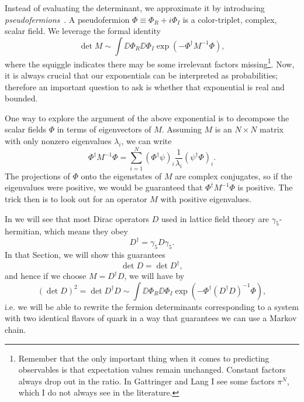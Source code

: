 Instead of evaluating the determinant, we approximate it
by introducing 
{\it pseudofermions}~\cite{fucito_proposal_1981,weingarten_physics_1981}.
A pseudofermion $\Phi\equiv\Phi_R+i\Phi_I$ is a color-triplet, complex, 
scalar field. We leverage the formal identity
\begin{equation}\label{eq:pseudofermionIdentity}
\det M \sim \int\DD{\Phi_R}\DD{\Phi_I}\exp\left(-\Phi^\dagger M^{-1}\Phi\right),
\end{equation}
where the squiggle indicates there may be some irrelevant factors 
missing\footnote{Remember that the only important thing when it comes to
predicting observables is that expectation values remain unchanged.
Constant factors always drop out in the ratio. In Gattringer and Lang I
see some factors $\pi^N$, which I do not always see in the literature.}.
Now, it is always crucial that our exponentials can be interpreted
as probabilities; therefore an important question to ask is whether
that exponential is real and bounded.

One way to explore the argument of the above exponential is to decompose
the scalar fields $\Phi$ in terms of eigenvectors of $M$. Assuming $M$
is an $N\times N$ matrix with only nonzero eigenvalues $\lambda_i$, 
we can write
\begin{equation}
\Phi^\dagger M^{-1}\Phi=\sum_{i=1}^N
\left(\Phi^\dagger\psi\right)_i\frac{1}{\lambda_i}\left(\psi^\dagger\Phi\right)_i.
\end{equation}
The projections of $\Phi$ onto the eigenstates of $M$ are complex
conjugates, so if the eigenvalues were positive, we would be guaranteed that
$\Phi^\dagger M^{-1}\Phi$ is positive. The trick then is to look
out for an operator $M$ with positive eigenvalues.

In  we will see that most Dirac operators $D$ used in
lattice field theory are $\gamma_5$-hermitian,
which means they obey
\begin{equation}
D^\dagger=\gamma_5 D \gamma_5.
\end{equation}
In that Section, we will show this guarantees
\begin{equation}
\det D = \det D^\dagger,
\end{equation}
and hence if we choose $M=D^\dagger D$, we will have
by 
\begin{equation}\label{eq:twoPseudofermionFlavors}
\left(\det D\right)^2 
=\det D^\dagger D 
\sim \int\DD{\Phi_R}\DD{\Phi_I}
\exp\left(-\Phi^\dagger \left(D^\dagger D\right)^{-1}\Phi\right),
\end{equation}
i.e. we will be able to rewrite the fermion determinants corresponding
to a system with two identical flavors of quark in a way that guarantees
we can use a Markov chain.

